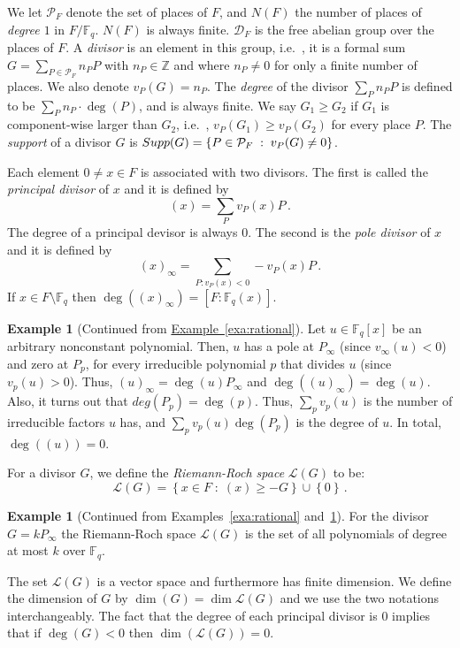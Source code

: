 \documentclass[10pt]{article}
\theoremstyle{definition}
\newtheorem{example}[theorem]{Example}
\providecommand{\ie}{i.e.\ }
\newcommand{\Z}{{\mathbb Z}}
\numberwithin{equation}{section}
\newcommand{\expref}[2]{\texorpdfstring{\hyperref[#2]{#1~\ref{#2}}}{#1~\ref{#2}}}
\newcommand{\cD}{\mathcal{D}}
\newcommand{\Fq}{{\mathbb{F}_q}}
\newcommand{\cL}{\mathcal{L}}
\newcommand{\set}[1]{{\left\{#1\right\}}}
\newcommand{\AllPl}{{\mathcal{P}}}
\newcommand{\supp}{{\rm Supp}}
\begin{document}
We let $\AllPl_F$ denote the set of places of $F$, and $N(F)$ the
number of places of \emph{degree $1$} in $F/\Fq $. $N(F)$ is always
finite. $\cD_F$ is the free abelian group over the places of $F$. A
\emph{divisor} is an element in this group, \ie, it is a formal sum
$G=\sum_{P \in \AllPl_F} n_P P$ with $n_P \in \Z$ and where $n_P
\neq 0$ for only a finite number of places. We also denote
$v_P(G)=n_P$. The \emph{degree} of the divisor $\sum_P n_P P$ is
defined to be $\sum_P n_P \cdot \deg(P)$, and is always finite.
We say $G_1 \ge G_2$ if $G_1$ is component-wise larger than $G_2$,
\ie, $v_P(G_1) \ge v_P(G_2)$ for every place $P$. The \emph{support}
of a divisor $G$ is $\supp(G) = \set{ P \in \AllPl_F \;:\; v_P(G)\neq
0}$.

Each element $0 \neq x \in F$ is associated with two divisors. The
first is called the \emph{principal divisor} of $x$ and it is defined
by
$$(x) = \sum_{P} v_P(x) P\,.$$
The degree of a principal devisor is always $0$. The second is the
\emph{pole divisor} of $x$ and it is defined by
$$(x)_\infty = \sum_{P: v_P(x) < 0} -v_P(x) P\,.$$ If $x\in F \setminus \Fq$ then $\deg((x)_\infty)=[F:\Fq (x)]$.

\begin{example}[Continued from \expref{Example}{exa:rational}]
\label{exa:rational:2} Let $u \in \Fq[x]$ be an arbitrary nonconstant polynomial.
Then, $u$ has a pole at $P_\infty$ (since
$v_\infty(u) < 0$) and zero at $P_p$, for every irreducible
polynomial $p$ that divides $u$ (since $v_p(u) > 0$). Thus,
$(u)_\infty = \deg(u) P_\infty$ and $\deg((u)_\infty)=\deg(u)$.
Also, it turns out that $deg(P_p)=\deg(p)$. Thus, $\sum_p v_p(u)$ is the
number of irreducible factors $u$ has, and $\sum_p v_p(u) \deg(P_p)$
is the degree of $u$. In total, $\deg((u))=0$.
\end{example}

For a divisor $G$, we define the \emph{Riemann-Roch space} $\cL(G)$
to be:
$$\cL(G) = \set{ x\in F \;:\; (x) \ge -G} \cup \set{0}\,.$$


\begin{example}[Continued from Examples~\ref{exa:rational} and~\ref{exa:rational:2}]
%
%
%
For the divisor $G=kP_\infty$ the Riemann-Roch space $\cL(G)$ is the set of all polynomials of
degree at most $k$ over $\Fq$.
\end{example}

The set $\cL(G)$ is a vector space and furthermore has finite
dimension. We define the dimension of $G$ by $\dim (G) = \dim
\cL(G)$ and we use the two notations interchangeably. The fact that
the degree of each principal divisor is $0$ implies that if $\deg(G)
< 0$ then $\dim(\cL(G)) = 0$.
\end{document}

